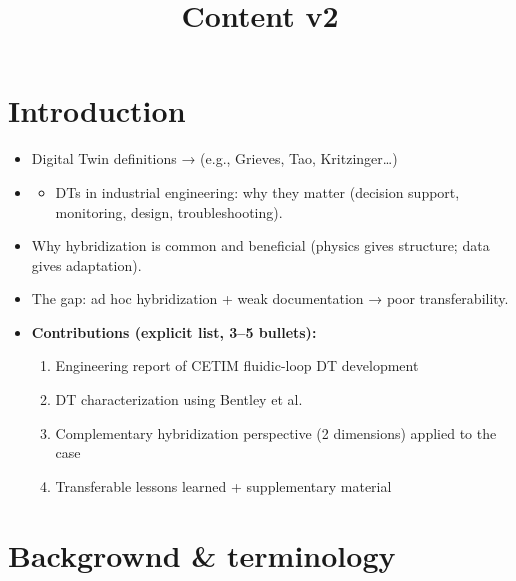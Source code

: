 \documentclass[
]{article}
\title{Content v2}
\author{}
\date{}
\providecommand{\tightlist}{%
  \setlength{\itemsep}{0pt}\setlength{\parskip}{0pt}}
\begin{document}
\maketitle

\section{Introduction}\label{introduction}

\begin{itemize}
\tightlist
\item
  Digital Twin definitions → (e.g., Grieves, Tao, Kritzinger\ldots)
\item
  \begin{itemize}
  \tightlist
  \item
    DTs in industrial engineering: why they matter (decision support,
    monitoring, design, troubleshooting).
  \end{itemize}
\item
  Why hybridization is common and beneficial (physics gives structure;
  data gives adaptation).
\item
  The gap: ad hoc hybridization + weak documentation → poor
  transferability.
\item
  \textbf{Contributions (explicit list, 3--5 bullets):}

  \begin{enumerate}
  \tightlist
  \item
    Engineering report of CETIM fluidic-loop DT development
  \item
    DT characterization using Bentley et al.
  \item
    Complementary hybridization perspective (2 dimensions) applied to
    the case
  \item
    Transferable lessons learned + supplementary material
  \end{enumerate}
\end{itemize}

\section{Backgrownd \& terminology}\label{backgrownd-terminology}
\end{document}
